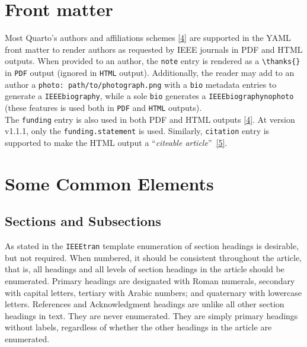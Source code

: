 \documentclass[
  journal,
]{IEEEtran}%
\theoremstyle{plain}
\theoremstyle{remark}
\begin{document}
\hypertarget{front-matter}{%
\section{Front matter}\label{front-matter}}

Most Quarto's authors and affiliations schemes
\protect\hyperlink{ref-quarto-funding}{{[}4{]}} are supported in the
YAML front matter to render authors as requested by IEEE journals in PDF
and HTML outputs. When provided to an author, the \texttt{note} entry is
rendered as a \texttt{\textbackslash{}thanks\{\}} in \texttt{PDF} output
(ignored in \texttt{HTML} output). Additionally, the reader may add to
an author a \texttt{photo:\ path/to/photograph.png} with a \texttt{bio}
metadata entries to generate a \texttt{IEEEbiography}, while a sole
\texttt{bio} generates a \texttt{IEEEbiographynophoto} (these features
is used both in \texttt{PDF} and \texttt{HTML} outputs).\\
The \texttt{funding} entry is also used in both PDF and HTML outputs
\protect\hyperlink{ref-quarto-funding}{{[}4{]}}. At version v1.1.1, only
the \texttt{funding.statement} is used. Similarly, \texttt{citation}
entry is supported to make the HTML output a ``\emph{citeable
article}''~\protect\hyperlink{ref-quarto-citation}{{[}5{]}}.

\hypertarget{some-common-elements}{%
\section{Some Common Elements}\label{some-common-elements}}

\hypertarget{sections-and-subsections}{%
\subsection{Sections and Subsections}\label{sections-and-subsections}}

As stated in the \texttt{IEEEtran} template enumeration of section
headings is desirable, but not required. When numbered, it should be
consistent throughout the article, that is, all headings and all levels
of section headings in the article should be enumerated. Primary
headings are designated with Roman numerals, secondary with capital
letters, tertiary with Arabic numbers; and quaternary with lowercase
letters. References and Acknowledgment headings are unlike all other
section headings in text. They are never enumerated. They are simply
primary headings without labels, regardless of whether the other
headings in the article are enumerated.
\end{document}
